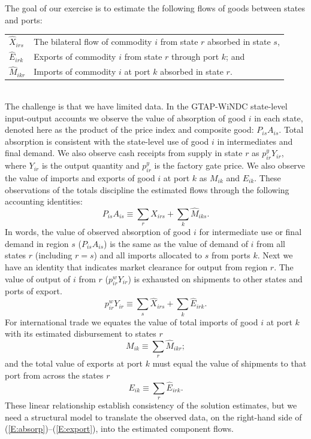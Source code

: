 \documentclass{ejb}
\begin{document}
The goal of our exercise is to estimate the following flows of goods between states
and ports:\\
\vspace{5pt}
\begin{tabular}{ll}
$\hat{X}_{irs}$& The bilateral flow of commodity $i$
from state $r$ absorbed in state $s$,\\
$\hat{E}_{irk}$& Exports of commodity $i$ from state
$r$ through port $k$; and\\
$\hat{M}_{ikr}$& Imports of commodity $i$ at port $k$ absorbed in state $r$.
\end{tabular}\\
The challenge is that we have limited data. In the GTAP-WiNDC
state-level input-output accounts we observe the value of absorption
of good $i$ in each state, denoted here as the product of the price
index and composite good: $P_{is} A_{is}$.  Total absorption is
consistent with the state-level use of good $i$ in intermediates and
final demand.  We also observe cash receipts from supply in state 
$r$ as $p^y_{ir} Y_{ir}$, where $Y_{ir}$ is the output quantity and
$p^y_{ir}$ is the factory gate price.  We also observe the value of
imports and exports of good $i$ at port $k$ as $M_{ik}$ and $E_{ik}$.
These observations of the totals discipline the estimated flows
through the following accounting identities:   
\begin{equation}
	P_{is} A_{is} \equiv \sum_r \hat{X}_{irs}  + \sum_k
	\hat{M}_{iks}.
\label{E:absorp}
\end{equation}
In words, the value of observed absorption of good $i$
for intermediate use or final demand in region $s$ ($P_{is} A_{is}$)
is the same as the value of demand of $i$ from all states $r$
(including $r=s$) and all imports allocated to $s$ from ports $k$.
Next we have an identity that indicates market clearance for output
from region $r$.  The value of output of $i$ from $r$ ($p^w_{ir}
Y_{ir}$) is exhausted on shipments to other states and ports of
export. 
\begin{equation}
	p^w_{ir} Y_{ir} \equiv \sum_s \hat{X}_{irs}  + \sum_k \hat{E}_{irk}.
\end{equation}
For international trade we equates the value of total imports of good
$i$ at port $k$ with its estimated disbursement to states $r$
\begin{equation}
	M_{ik} \equiv \sum_r \hat{M}_{ikr};
\end{equation}
and the total value of exports at port $k$ must equal the value of
shipments to that port from across the states $r$
\begin{equation}
	E_{ik} \equiv \sum_r \hat{E}_{irk}.
\label{E:export}
\end{equation}
These linear relationship establish consistency of the solution
estimates, but we need a structural model to translate the observed
data, on the right-hand side of (\ref{E:absorp})--(\ref{E:export}),
into the estimated component flows.
\end{document}
